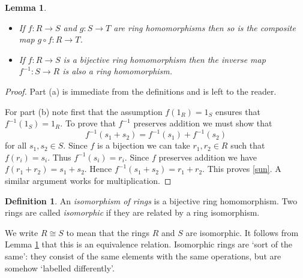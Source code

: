 \documentclass [12pt,oneside,a4paper,mathscr]{amsart}
\newtheorem{lemma}[thm]{Lemma}
\theoremstyle{definition}
\newtheorem{defn}[thm]{Definition}
\newcommand{\isom}{\cong}
\begin{document}
\begin{lemma}
\label{obv}
\begin{itemize}
\item[(a)] If $f\colon R\to S$ and $g\colon S \to T$ are ring homomorphisms then so is the composite map $g\circ f\colon R \to T$.
\smallskip
\item[(b)] If $f\colon R \to S$ is a bijective ring homomorphism then the inverse map $f^{-1}\colon S \to R$ is also a ring homomorphism.
\end{itemize}
\end{lemma}

\begin{proof}
Part (a) is immediate from the definitions and is left to the reader.

For part (b) note first that the assumption $f(1_R)=1_S$ ensures that $f^{-1}(1_S)=1_R$. To prove that $f^{-1}$ preserves addition we must show that
\begin{equation}
\label{sun}f^{-1}(s_1+s_2)=f^{-1}(s_1)+f^{-1}(s_2)\end{equation}
for all $s_1,s_2\in S$. Since $f$ is a bijection we can take $r_1,r_2\in R$ such that $f(r_i)=s_i$. Thus $f^{-1}(s_i)=r_i$. Since $f$ preserves addition  we have $f(r_1+r_2)=s_1+s_2$.  Hence $f^{-1}(s_1+s_2)=r_1+r_2$. This proves \eqref{sun}. A similar argument works for multiplication.
\end{proof}

\begin{defn}An \emph{isomorphism of rings} is a bijective  ring homomorphism. Two rings are called \emph{isomorphic} if they are related by a ring isomorphism. \end{defn}

We write $R\isom S$ to mean that the rings $R$ and $S$ are isomorphic. It follows from Lemma \ref{obv} that this is an equivalence relation. Isomorphic rings are `sort of the same': they consist of the same elements with the same operations, but are somehow `labelled differently'. 
\end{document}
